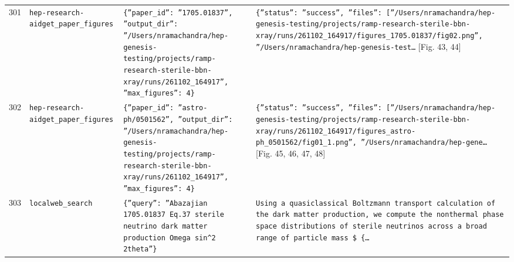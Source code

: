\documentclass[11pt,a4paper]{article}
\begin{document}
\begin{longtable}{@{}p{}p{}p{}p{}@{}}
301 & \texttt{hep-research-aid}\newline\texttt{get\_\allowbreak{}paper\_\allowbreak{}figures} & \texttt{\{''paper\_\allowbreak{}id'':\allowbreak{} ''1705.01837'',\allowbreak{} ''output\_\allowbreak{}dir'':\allowbreak{} ''/\allowbreak{}Users/\allowbreak{}nramachandra/\allowbreak{}hep-genesis-testing/\allowbreak{}projects/\allowbreak{}ramp-research-sterile-bbn-xray/\allowbreak{}runs/\allowbreak{}261102\_\allowbreak{}164917'',\allowbreak{} ''max\_\allowbreak{}figures'':\allowbreak{} 4\}\allowbreak{}} & \texttt{\{''status'':\allowbreak{} ''success'',\allowbreak{} ''files'':\allowbreak{} [''/\allowbreak{}Users/\allowbreak{}nramachandra/\allowbreak{}hep-genesis-testing/\allowbreak{}projects/\allowbreak{}ramp-research-sterile-bbn-xray/\allowbreak{}runs/\allowbreak{}261102\_\allowbreak{}164917/\allowbreak{}figures\_\allowbreak{}1705.01837/\allowbreak{}fig02.png'',\allowbreak{} ''/\allowbreak{}Users/\allowbreak{}nramachandra/\allowbreak{}hep-genesis-test\ldots{}\allowbreak{}} [Fig. 43, 44] \\
302 & \texttt{hep-research-aid}\newline\texttt{get\_\allowbreak{}paper\_\allowbreak{}figures} & \texttt{\{''paper\_\allowbreak{}id'':\allowbreak{} ''astro-ph/\allowbreak{}0501562'',\allowbreak{} ''output\_\allowbreak{}dir'':\allowbreak{} ''/\allowbreak{}Users/\allowbreak{}nramachandra/\allowbreak{}hep-genesis-testing/\allowbreak{}projects/\allowbreak{}ramp-research-sterile-bbn-xray/\allowbreak{}runs/\allowbreak{}261102\_\allowbreak{}164917'',\allowbreak{} ''max\_\allowbreak{}figures'':\allowbreak{} 4\}\allowbreak{}} & \texttt{\{''status'':\allowbreak{} ''success'',\allowbreak{} ''files'':\allowbreak{} [''/\allowbreak{}Users/\allowbreak{}nramachandra/\allowbreak{}hep-genesis-testing/\allowbreak{}projects/\allowbreak{}ramp-research-sterile-bbn-xray/\allowbreak{}runs/\allowbreak{}261102\_\allowbreak{}164917/\allowbreak{}figures\_\allowbreak{}astro-ph\_\allowbreak{}0501562/\allowbreak{}fig01\_\allowbreak{}1.png'',\allowbreak{} ''/\allowbreak{}Users/\allowbreak{}nramachandra/\allowbreak{}hep-gene\ldots{}\allowbreak{}} [Fig. 45, 46, 47, 48] \\
303 & \texttt{local}\newline\texttt{web\_\allowbreak{}search} & \texttt{\{''query'':\allowbreak{} ''Abazajian 1705.01837 Eq.37 sterile neutrino dark matter production Omega sin\textasciicircum{}\allowbreak{}2 2theta''\}\allowbreak{}} & \texttt{Using a quasiclassical Boltzmann transport calculation of the dark matter production,\allowbreak{} we compute the nonthermal phase space distributions of sterile neutrinos across a broad range of particle mass \$ \{\ldots{}\allowbreak{}} \\

\end{longtable}
\end{document}
